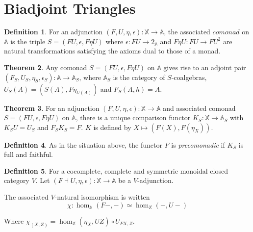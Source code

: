 \documentclass{article}
\numberwithin{equation}{section}
\theoremstyle{definition}
\newtheorem{thm}{Theorem}[section]
\theoremstyle{definition}
\newtheorem{defn}[thm]{Definition}
\theoremstyle{remark}
\theoremstyle{remark}
\begin{document}
\section{Biadjoint Triangles}

	\begin{defn} 
		For an adjunction $ (F,U,\eta,\epsilon):\mathbb{X}\longrightarrow \mathbb{A}$, the associated $ comonad$ on $ \mathbb{A}$ is the triple $ S = (FU, \epsilon, F \eta U)$ where $ \epsilon: FU \longrightarrow 2_{ \mathbb{A}}$ and $ F \eta U: FU \longrightarrow FU^2$ are natural transformations satisfying the axioms dual to those of a monad.
	\end{defn}
		
	\begin{thm}
		Any comonad $ S = (FU, \epsilon, F \eta U)$ on $ \mathbb{A}$ gives rise to an adjoint pair $ (F_S,U_S,\eta_S,\epsilon_S):\mathbb{A}\longrightarrow \mathbb{A}_S$, where $ \mathbb{A}_S$ is the category of $ S$-coalgebras, $U_S(A)= (S(A), F \eta_{U(A)}) $ and $ F_S(A, h) = A$.
	\end{thm}
	
	\begin{thm}
		For an adjunction $ (F,U,\eta,\epsilon):\mathbb{X}\longrightarrow \mathbb{A}$ and associated comonad $ S = (FU, \epsilon, F\eta U)$ on $ \mathbb{A}$, there is a unique comparison functor $ K_S: \mathbb{X} \longrightarrow \mathbb{A}_S$ with $K_S U = U_S$ and $F_SK_S = F$. $ K$ is defined by $ X \longmapsto (F(X), F(\eta_X))$. 
	\end{thm}
	
	\begin{defn}
		As in the situation above, the functor $ F$ is \textit{precomonadic} if $ K_S$ is full and faithful.
	\end{defn}

	\begin{defn}
		For a cocomplete, complete and symmetric monoidal closed category $ V$. Let $ (F \dashv U, \eta, \epsilon): \mathbb{X} \longrightarrow \mathbb{A} $ be a $ V$-adjunction.

		The associated $V$-natural isomorphism is written
		\[
		 \chi : \hom _{ \mathbb{A}}(F-,-) \simeq \hom _{ \mathbb{X}}(-,U-)
		\] 

		Where $ \chi_{(X,Z)}= \hom_{\mathbb{X}}(\eta_X, UZ) \circ U_{FX,Z}$.
	\end{defn}
\end{document}
